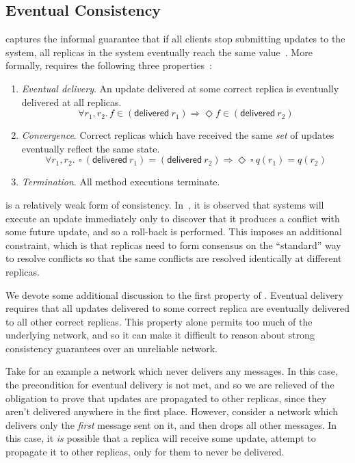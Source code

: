 \subsection{Eventual Consistency}
\EC captures the informal guarantee that if all clients stop submitting updates
to the system, all replicas in the system eventually reach the same
value~\citep{shapiro11}. More formally, \EC requires the following three
properties~\citep{shapiro11}:
\begin{enumerate}
  \item \emph{Eventual delivery}. An update delivered at some correct replica is
    eventually delivered at all replicas.
    \[
      \forall r_1, r_2.\, f \in (\textsf{delivered}~r_1) \Rightarrow \Diamond f
      \in (\textsf{delivered}~r_2)
    \]
  \item \emph{Convergence}. Correct replicas which have received the same
    \emph{set} of updates eventually reflect the same state.
    \[
      \forall r_1, r_2.\,~\square~(\textsf{delivered}~r_1) =
      (\textsf{delivered}~r_2) \Rightarrow \Diamond~\square~q(r_1) = q(r_2)
    \]
  \item \emph{Termination}. All method executions terminate.
\end{enumerate}

\EC is a relatively weak form of consistency. In~\citet{shapiro11}, it is
observed that \EC systems will execute an update immediately only to discover
that it produces a conflict with some future update, and so a roll-back is
performed. This imposes an additional constraint, which is that replicas need
to form consensus on the ``standard'' way to resolve conflicts so that the same
conflicts are resolved identically at different replicas.

We devote some additional discussion to the first property of \EC. Eventual
delivery requires that all updates delivered to some correct replica are
eventually delivered to all other correct replicas. This property alone permits
too much of the underlying network, and so it can make it difficult to reason
about strong consistency guarantees over an unreliable network.

Take for an example a network which never delivers any messages. In this case,
the precondition for eventual delivery is not met, and so we are relieved of the
obligation to prove that updates are propagated to other replicas, since they
aren't delivered anywhere in the first place. However, consider a network which
delivers only the \emph{first} message sent on it, and then drops all other
messages. In this case, it \emph{is} possible that a replica will receive some
update, attempt to propagate it to other replicas, only for them to never be
delivered.

